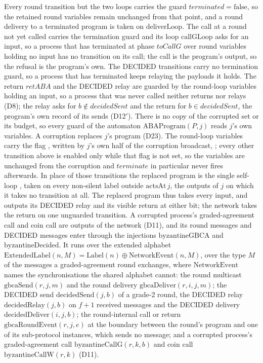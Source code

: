 \begin{definition}
  Every round transition but the two loops carries the guard $terminated = \mathrm{false}$, so the retained round variables remain unchanged from that point, and a round delivery to a terminated program is taken on $\mathrm{deliverLoop}$.
  The call at a round not yet called carries the termination guard and its loop $\mathrm{callGLoop}$ asks for an input, so a process that has terminated at phase $toCallG$ over round variables holding no input has no transition on its call; the call is the program's output, so the refusal is the program's own.
  The DECIDED transitions carry no termination guard, so a process that has terminated keeps relaying the payloads it holds.
  The return $retABA$ and the DECIDED relay are guarded by the round-loop variables holding an input, so a process that was never called neither returns nor relays (D8); the relay asks for $b \notin decidedSent$ and the return for $b \in decidedSent$, the program's own record of its sends (D12$'$).
  There is no copy of the corrupted set or its budget, so every guard of the automaton $\mathrm{ABAProgram}(P,j)$ reads $j$'s own variables.
  A corruption replaces $j$'s program (D23).
  The round-loop variables carry the flag , written by $j$'s own half of the corruption broadcast, ; every other transition above is enabled only while that flag is not set, so the variables are unchanged from the corruption and $terminate$ in particular never fires afterwards.
  In place of those transitions the replaced program is the single self-loop , taken on every non-silent label outside $\mathrm{actsAt}\,j$, the outputs of $j$ on which it takes no transition at all.
  The replaced program thus takes every input, and outputs its DECIDED relay and its visible return at either bit; the network takes the return on one unguarded transition.
  A corrupted process's graded-agreement call and coin call are outputs of the network (D11), and its round messages and DECIDED messages enter through the injections $\mathrm{byzantineGBCA}$ and $\mathrm{byzantineDecided}$.
  It runs over the extended alphabet $\mathrm{ExtendedLabel}(n, M) = \mathrm{Label}(n) \oplus \mathrm{NetworkEvent}(n, M)$, over the type $M$ of the messages a graded-agreement round exchanges, where $\mathrm{NetworkEvent}$ names the synchronisations the shared alphabet cannot: the round multicast $\mathrm{gbcaSend}(r,j,m)$ and the round delivery $\mathrm{gbcaDeliver}(r,i,j,m)$; the DECIDED send $\mathrm{decidedSend}(j,b)$ of a grade-2 round, the DECIDED relay $\mathrm{decidedRelay}(j,b)$ on $f+1$ received messages and the DECIDED delivery $\mathrm{decidedDeliver}(i,j,b)$; the round-internal call or return $\mathrm{gbcaRoundEvent}(r,j,e)$ at the boundary between the round's program and one of its sub-protocol instances, which sends no message; and a corrupted process's graded-agreement call $\mathrm{byzantineCallG}(r,k,b)$ and coin call $\mathrm{byzantineCallW}(r,k)$ (D11).

\end{definition}

